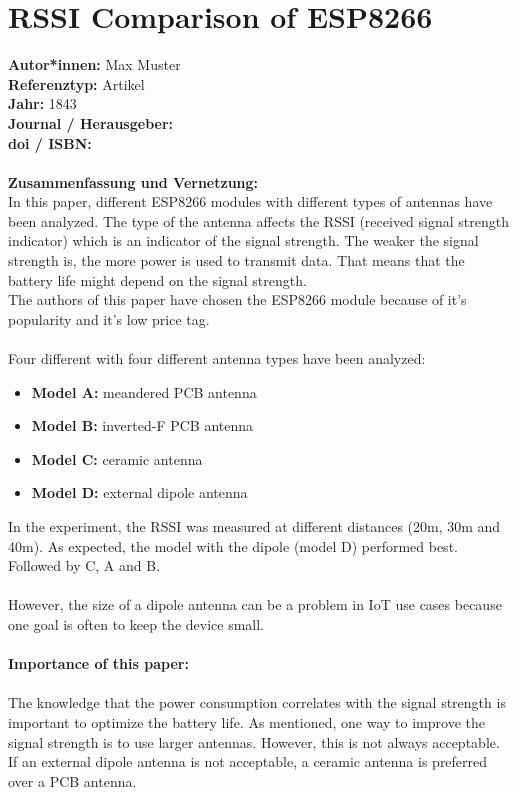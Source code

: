 \documentclass{report}
\begin{document}
{\let\clearpage\relax \chapter{RSSI Comparison of ESP8266}}
\noindent
\textbf{Autor*innen:} Max Muster\\
\textbf{Referenztyp:} Artikel\\
\textbf{Jahr:} 1843\\
\textbf{Journal / Herausgeber:}\\
\textbf{doi / ISBN:}\\\\
\textbf{Zusammenfassung und Vernetzung:}\\
In this paper, different ESP8266 modules with different types of antennas have been analyzed.
The type of the antenna affects the RSSI (received signal strength indicator) which is an indicator of the signal strength.
The weaker the signal strength is, the more power is used to transmit data.
That means that the battery life might depend on the signal strength.
\\
The authors of this paper have chosen the ESP8266 module because of it's popularity and it's low price tag.
\\\\
Four different with four different antenna types have been analyzed:\\
\begin{itemize}
    \item \textbf{Model A:} meandered PCB antenna
    \item \textbf{Model B:} inverted-F PCB antenna
    \item \textbf{Model C:} ceramic antenna
    \item \textbf{Model D:} external dipole antenna
\end{itemize}

In the experiment, the RSSI was measured at different distances (20m, 30m and 40m).
As expected, the model with the dipole (model D) performed best. Followed by C, A and B.
\\\\
However, the size of a dipole antenna can be a problem in IoT use cases because one goal is often to keep the device small.
\\\\
\textbf{Importance of this paper:}
\\\\
The knowledge that the power consumption correlates with the signal strength is important to optimize the battery life.
As mentioned, one way to improve the signal strength is to use larger antennas. However, this is not always acceptable.
If an external dipole antenna is not acceptable, a ceramic antenna is preferred over a PCB antenna.
\end{document}
